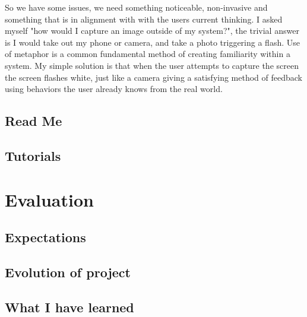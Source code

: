 \documentclass[a4paper]{report}
\begin{document}
So we have some issues, we need something noticeable, non-invasive and something that is in alignment with with the users current thinking. I asked myself "how would I capture an image outside of my system?", the trivial answer is I would take out my phone or camera, and take a photo triggering a flash. Use of metaphor is a common fundamental method of creating familiarity within a system. My simple solution is that when the user attempts to capture the screen the screen flashes white, just like a camera giving a satisfying method of feedback using behaviors the user already knows from the real world. 

\section{Read Me}
\section{Tutorials}

\chapter{Evaluation}
\section{Expectations}
\section{Evolution of project}
\section{What I have learned}




\end{document}
